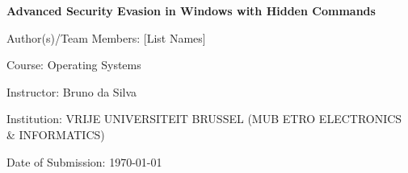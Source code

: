 \documentclass[11pt]{article}
\begin{document}
	\justifying
	
	\begin{titlepage}
		\centering
		{\Huge\bfseries Advanced Security Evasion in Windows with Hidden Commands\par}
		\vspace{1.5cm}
		{\Large Author(s)/Team Members: [List Names]\par} %
		\vspace{0.5cm}
		{\large Course: Operating Systems\par} %
		\vspace{0.5cm}
		{\large Instructor: Bruno da Silva\par}
		\vspace{0.5cm}
		{\large Institution: VRIJE UNIVERSITEIT BRUSSEL (MUB ETRO ELECTRONICS & INFORMATICS)\par}
		\vspace{1.0cm}
		{\large Date of Submission: \today\par}
	\end{titlepage}
	
	\tableofcontents
	\newpage
	\listoffigures
	\newpage
	\listoftables %
	\newpage
	
\end{document}
